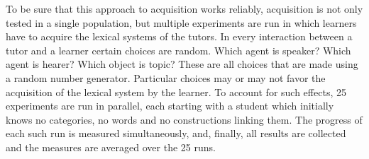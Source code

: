 To be sure that this approach to acquisition works reliably, acquisition is not only tested
in a single population, but multiple experiments are run in which learners have to 
acquire the lexical systems of the tutors. In every interaction between a tutor and a learner certain 
choices are random. Which agent is speaker? Which agent is hearer? Which object is topic? 
These are all choices that are made using a random number generator. Particular
choices may or may not favor the acquisition of the lexical system by the learner. 
To account for such effects, 25 experiments are run in parallel, each starting with a 
student which initially knows no categories, no words and no constructions linking them. 
The progress of each such run is measured simultaneously, and, finally, all results are 
collected and the measures are averaged over the 25 runs.

